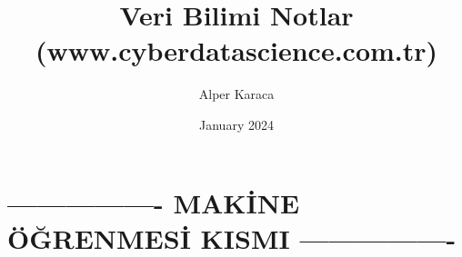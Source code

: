 \documentclass{article}
\title{Veri Bilimi Notlar (www.cyberdatascience.com.tr)}
\author{Alper Karaca}
\date{January 2024}
\begin{document}
\maketitle

\newpage
\tableofcontents
\newpage




\section{---------------- MAKİNE ÖĞRENMESİ KISMI ----------------}
\newpage




























































\end{document}
